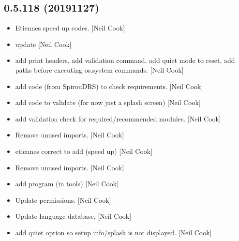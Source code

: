 \documentclass[a4paper,10pt,english]{report}
\begin{document}
\subsection{0.5.118 (2019\sphinxhyphen{}11\sphinxhyphen{}27)}
\label{\detokenize{misc/changelog:id44}}\begin{itemize}
\item {} 
Etiennes speed up codes. {[}Neil Cook{]}

\item {} 
 \sphinxhyphen{} update  {[}Neil Cook{]}

\item {} 
 \sphinxhyphen{} add print headers, add
validation command, add quiet mode to reset, add paths before
executing os.system commands. {[}Neil Cook{]}

\item {} 
 \sphinxhyphen{} add code (from SpirouDRS) to check
requirements. {[}Neil Cook{]}

\item {} 
 \sphinxhyphen{} add code to validate (for now just a splash
screen) {[}Neil Cook{]}

\item {} 
 \sphinxhyphen{} add validation check for required/recommended
modules. {[}Neil Cook{]}

\item {} 
Remove unused imports. {[}Neil Cook{]}

\item {} 
 \sphinxhyphen{} etiennes correct to
add (speed up) {[}Neil Cook{]}

\item {} 
Remove unused imports. {[}Neil Cook{]}

\item {} 
 \sphinxhyphen{} add 
program (in tools) {[}Neil Cook{]}

\item {} 
Update permissions. {[}Neil Cook{]}

\item {} 
Update language database. {[}Neil Cook{]}

\item {} 
 \sphinxhyphen{} add quiet option so setup info/splash is not
displayed. {[}Neil Cook{]}


\end{itemize}
\end{document}
